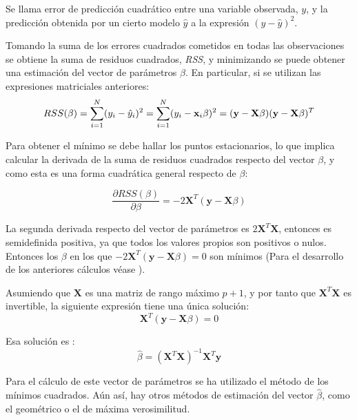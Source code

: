 \begin{defi}
Se llama error de predicción cuadrático entre una variable observada, $y$, y la predicción obtenida por un cierto modelo $\hat{y}$ a la expresión $(y-\hat{y})^2$.
\end{defi}

\noindent Tomando la suma de los errores cuadrados cometidos  en todas las observaciones se obtiene la suma de residuos cuadrados, \emph{RSS}, y minimizando se puede obtener una estimación del vector de parámetros $\beta$. En particular, si se utilizan las expresiones matriciales  anteriores:
\begin{equation}
RSS(\beta)=\sum_{i=1}^N(y_i-\hat{y}_i)^2 = \sum_{i=1}^N(y_i-\textbf{x}_i\beta)^2=(\textbf{y}-\textbf{X}\beta)(\textbf{y}-\textbf{X}\beta)^T\\
\end{equation}

\noindent Para obtener el mínimo se debe hallar los puntos estacionarios, lo que implica calcular la derivada de la suma de residuos cuadrados respecto del vector $\beta$, y como esta es una forma cuadrática general respecto de $\beta$:

\begin{equation}
\dfrac{\partial RSS(\beta)}{\partial \beta}= -2\mathbf{X}^T(\mathbf{y}-\mathbf{X}\beta)
\end{equation}

\noindent La segunda derivada respecto del vector de parámetros es $2\mathbf{X}^T\mathbf{X}$, entonces es  semidefinida positiva, ya que todos los valores propios son positivos o nulos. Entonces los $\beta$ en los que $-2\mathbf{X}^T(\mathbf{y}-\mathbf{X}\beta)=0$ son mínimos (Para el desarrollo de los anteriores cálculos véase \cite{Morrison 1976}).  

\noindent Asumiendo que $\textbf{X}$ es una matriz de rango máximo $p+1$, y por tanto que $\mathbf{X}^T \mathbf{X}$ es invertible, la siguiente expresión tiene una única solución: 
\begin{equation}
\textbf{X}^T(\textbf{y}-\textbf{X}\beta)=0
\end{equation}

\noindent Esa solución es :
\begin{equation}
\hat{\beta}=(\textbf{X}^T\textbf{X})^{-1}\textbf{X}^T\textbf{y}
\end{equation}

\noindent Para el cálculo de este vector de parámetros se ha utilizado el método de los mínimos cuadrados. Aún así, hay otros métodos de estimación del vector $\hat{\beta}$, como el geométrico o el de máxima verosimilitud. 

